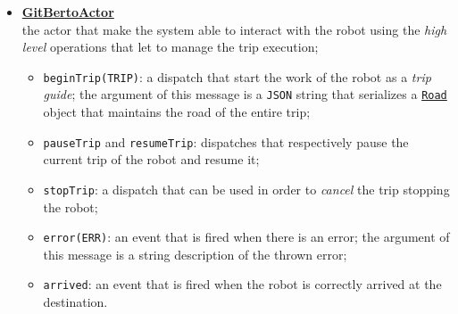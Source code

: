 \begin{itemize}
\begin{itemize}
	 	\item \texttt{cmd(CMD)}: a dispatch that can be used to enable the \textit{location monitoring} work of this actor; the possible arguments of this message are two: \texttt{enableMonitoring} or \texttt{disableMonitoring} to enable or disable;
	 	
	 	\item \textcolor{BrickRed}{\texttt{newLocation}}: an event that is fired when the location of the device is changed; the argument of this message is a \texttt{JSON} string that serialize a \href{https://github.com/LucaLand/MobileSystemsProject-LL/blob/0.9.1/app/src/main/java/it/unibo/mobilesystems/geo/KLocation.kt}{\texttt{KLocation}}\footnote{We have suitably created this class because the \href{https://developer.android.com/reference/android/location/Location}{\texttt{Location}} that is present in \texttt{Android} is not serializable.} instance;
	 \end{itemize}
	 
	 \item \underline{\textbf{GitBertoActor}}\\
	 the actor that make the system able to interact with the robot using the \textit{high level} operations that let to manage the trip execution;
	 \begin{itemize}
	 	\item \texttt{beginTrip(TRIP)}: a dispatch that start the work of the robot as a \textit{trip guide}; the argument of this message is a \texttt{JSON} string that serializes a \href{https://github.com/MKergall/osmbonuspack/blob/master/OSMBonusPack/src/main/java/org/osmdroid/bonuspack/routing/Road.java}{\texttt{Road}} object that maintains the road of the entire trip;
	 	
	 	\item \texttt{pauseTrip} and \texttt{resumeTrip}: dispatches that respectively pause the current trip of the robot and resume it;
	 	
	 	\item \texttt{stopTrip}: a dispatch that can be used in order to \textit{cancel} the trip stopping the robot;
	 	
	 	\item \textcolor{BrickRed}{\texttt{error(ERR)}}: an event that is fired when there is an error; the argument of this message is a string description of the thrown error;
	 	
	 	\item \textcolor{BrickRed}{\texttt{arrived}}: an event that is fired when the robot is correctly arrived at the destination.
	 \end{itemize}
\end{itemize}
